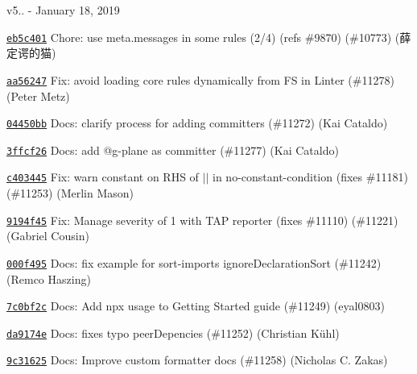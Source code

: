 v5.. -\/ January 18, 2019


\begin{DoxyItemize}
\item \href{https://github.com/eslint/eslint/commit/eb5c4014f16be1c2003ed46ce9560d0d8a567d0f}{\texttt{ {\ttfamily eb5c401}}} Chore\+: use meta.\+messages in some rules (2/4) (refs \#9870) (\#10773) (薛定谔的猫)
\item \href{https://github.com/eslint/eslint/commit/aa56247746a0095996a41dd03bdbbf659f0f93b6}{\texttt{ {\ttfamily aa56247}}} Fix\+: avoid loading core rules dynamically from FS in Linter (\#11278) (Peter Metz)
\item \href{https://github.com/eslint/eslint/commit/04450bb7ed20f2412102538b238119d9764b4dc9}{\texttt{ {\ttfamily 04450bb}}} Docs\+: clarify process for adding committers (\#11272) (Kai Cataldo)
\item \href{https://github.com/eslint/eslint/commit/3ffcf26c1c83efe7d7cf2d87f1063695ae653709}{\texttt{ {\ttfamily 3ffcf26}}} Docs\+: add @g-\/plane as committer (\#11277) (Kai Cataldo)
\item \href{https://github.com/eslint/eslint/commit/c40344566eff2e77a6ae2b2d2dbdbd4ad3e76b67}{\texttt{ {\ttfamily c403445}}} Fix\+: warn constant on RHS of \texorpdfstring{$\vert$}{|}\texorpdfstring{$\vert$}{|} in no-\/constant-\/condition (fixes \#11181) (\#11253) (Merlin Mason)
\item \href{https://github.com/eslint/eslint/commit/9194f45ac7d521119a53773bf02b81670bad526e}{\texttt{ {\ttfamily 9194f45}}} Fix\+: Manage severity of 1 with TAP reporter (fixes \#11110) (\#11221) (Gabriel Cousin)
\item \href{https://github.com/eslint/eslint/commit/000f4952ae6a4311fbbc3ed36c481235fcb0b64b}{\texttt{ {\ttfamily 000f495}}} Docs\+: fix example for sort-\/imports ignore\+Declaration\+Sort (\#11242) (Remco Haszing)
\item \href{https://github.com/eslint/eslint/commit/7c0bf2ca92d83125a1fa000c9c4250bae6b4fc21}{\texttt{ {\ttfamily 7c0bf2c}}} Docs\+: Add {\ttfamily npx} usage to Getting Started guide (\#11249) (eyal0803)
\item \href{https://github.com/eslint/eslint/commit/da9174e0798c1d785ddabb3ae405860fc5b89311}{\texttt{ {\ttfamily da9174e}}} Docs\+: fixes typo peer\+Depencies (\#11252) (Christian Kühl)
\item \href{https://github.com/eslint/eslint/commit/9c31625f19176664ef76dcf088ce50703c41c324}{\texttt{ {\ttfamily 9c31625}}} Docs\+: Improve custom formatter docs (\#11258) (Nicholas C. Zakas)
\end{DoxyItemize}

